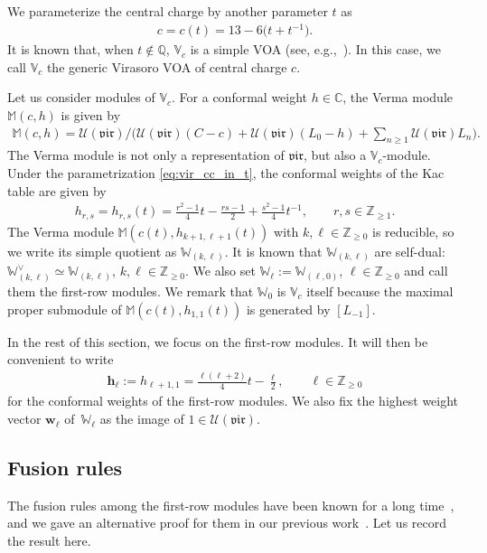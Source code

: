 \documentclass[10pt,a4paper]{amsart}
\numberwithin{equation}{section}
\newcommand{\bC}{\mathbb{C}}
\newcommand{\bQ}{\mathbb{Q}}
\newcommand{\bZ}{\mathbb{Z}}
\newcommand{\cU}{\mathcal{U}}
\newcommand{\UEA}{\cU}
\newcommand{\virvoa}{\mathbb{V}}
\newcommand{\virVerma}{\mathbb{M}}
\newcommand{\virmod}{\mathbb{W}}
\newcommand{\vir}{\mathfrak{vir}}
\newcommand{\hwvec}{\mathbf{w}}
\newcommand{\frweight}[1]{\mathbf{h}_{#1}}
\begin{document}
We parameterize the central charge by another parameter $t$ as
\begin{gather}
\label{eq:vir_cc_in_t}
 c=c(t)=13-6\big(t+t^{-1}\big).
\end{gather}
It is known that, when $t\not\in\bQ$, $\virvoa_{c}$ is a simple VOA (see, e.g.,~\cite{IK-representation_theory_of_the_Virasoro_algebra}).
In this case, we call $\virvoa_{c}$ the generic Virasoro VOA of central charge $c$.

Let us consider modules of $\virvoa_{c}$.
For a conformal weight $h\in\bC$, the Verma module $\virVerma (c,h)$ is given by
\begin{gather*}
 \virVerma (c,h)= \UEA (\vir)/\big(\UEA (\vir)(C-c)+\UEA(\vir)(L_{0}-h)+\textstyle{\sum_{n\geq 1}}\UEA(\vir)L_{n}\big).
\end{gather*}
The Verma module is not only a representation of $\vir$, but also a $\virvoa_{c}$-module.
Under the parametrization \eqref{eq:vir_cc_in_t}, the conformal weights of the Kac table are given by
\begin{gather*}
	h_{r,s} = h_{r,s}(t)= \frac{r^{2}-1}{4}t-\frac{rs-1}{2}+\frac{s^{2}-1}{4}t^{-1},\qquad r,s\in \bZ_{\geq 1}.
\end{gather*}
The Verma module $\virVerma (c(t),h_{k+1,\ell +1}(t))$ with $k,\ell\in\bZ_{\geq 0}$ is reducible, so we write its simple quotient as $\virmod_{(k,\ell)}$.
It is known that $\virmod_{(k,\ell)}$ are self-dual: $\virmod_{(k,\ell)}^{\vee}\simeq \virmod_{(k,\ell)}$, $k,\ell\in\bZ_{\geq 0}$.
We also set $\virmod_{\ell}:= \virmod_{(\ell,0)}$, $\ell\in\bZ_{\geq 0}$ and call them the first-row modules.
We remark that $\virmod_{0}$ is $\virvoa_{c}$ itself because the maximal proper submodule of $\virVerma (c(t),h_{1,1}(t))$ is generated by $[L_{-1}]$.

In the rest of this section, we focus on the first-row modules.
It will then be convenient to write
\begin{gather}
\label{eq:conf_weight_fr}
	\frweight{\ell}:= h_{\ell+1,1} = \frac{\ell(\ell+2)}{4}t-\frac{\ell}{2},\qquad \ell\in\bZ_{\geq 0}
\end{gather}
for the conformal weights of the first-row modules.
We also fix the highest weight vector $\hwvec_{\ell}$ of~$\virmod_{\ell}$ as the image of $1\in\UEA(\vir)$.

\subsection{Fusion rules}
The fusion rules among the first-row modules have been known for a long time~\cite{FrenkelZhu2012}, and we gave an alternative proof for them in our previous work~\cite{KoshidaKytola2022}.
Let us record the result here.
\end{document}

